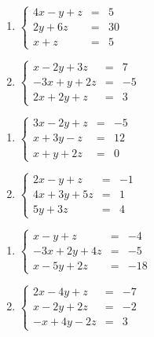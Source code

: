 \documentclass{ximera}
\begin{document}
\begin{multicols}{2}
\begin{enumerate}
\setcounter{enumi}{\value{HW}}


\item $\left\{ \begin{array}{rcr} 4x - y + z & = & 5 \\ 2y + 6z & = & 30 \\ x + z & = & 5  \end{array} \right.$

\item $\left\{ \begin{array}{rcr} x-2y+3z & = & 7 \\ -3x+y+2z & = & -5 \\ 2x+2y+z & = & 3  \end{array} \right.$

\setcounter{HW}{\value{enumi}}
\end{enumerate}
\end{multicols}


\begin{multicols}{2}
\begin{enumerate}
\setcounter{enumi}{\value{HW}}


\item $\left\{ \begin{array}{rcr} 3x-2y+z & = & -5 \\ x+3y-z & = & 12 \\ x+y+2z & = & 0  \end{array} \right.$
\item $\left\{ \begin{array}{rcr} 2x-y+z& = & -1 \\ 4x+3y+5z & = & 1 \\  5y+3z & = & 4 \end{array} \right.$

\setcounter{HW}{\value{enumi}}
\end{enumerate}
\end{multicols}


\begin{multicols}{2}
\begin{enumerate}
\setcounter{enumi}{\value{HW}}


\item $\left\{ \begin{array}{rcr} x-y+z & = & -4 \\ -3x+2y+4z & = & -5 \\ x-5y+2z & = & -18  \end{array} \right.$
\item $\left\{ \begin{array}{rcr} 2x-4y+z & = & -7 \\ x-2y+2z & = & -2 \\ -x+4y-2z & = & 3  \end{array} \right.$

\setcounter{HW}{\value{enumi}}
\end{enumerate}
\end{multicols}
\end{document}
